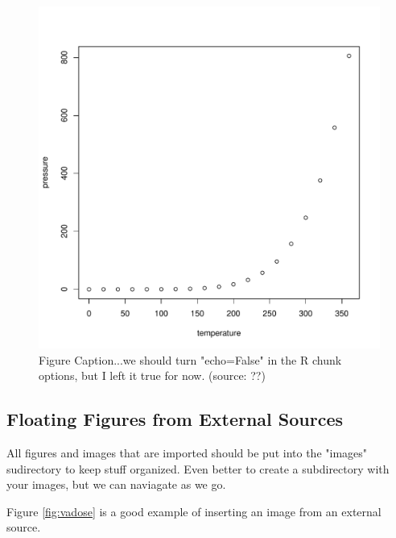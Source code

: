 \documentclass{book}\usepackage{knitr}
\begin{document}
\begin{knitrout}
\begin{kframe}
\begin{figure}
\begin{knitrout}
\color{fgcolor}\begin{kframe}
\begin{alltt}
\end{alltt}
\end{kframe}
\includegraphics[width=\maxwidth]{figure/fig:pressure-1} 

\end{knitrout}
\caption{Figure Caption...we should turn "echo=False" in the R chunk options, but I left it true for now. (source: ??)} %
\label{fig:pressure}

\end{figure}

\subsection{Floating Figures from External Sources}

All figures and images that are imported should be put into the "images" sudirectory to keep stuff organized. Even better to create a subdirectory with your images, but we can naviagate as we go.

Figure \ref{fig:vadose} is a good example of inserting an image from an external source.


\end{kframe}
\end{knitrout}
\end{document}
